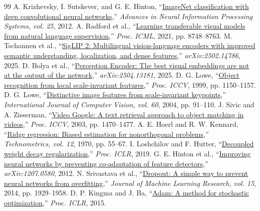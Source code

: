 \documentclass[conference,a4paper]{IEEEtran}
\begin{document}
\clearpage
{}
\begin{thebibliography}{99}
 A. Krizhevsky, I. Sutskever, and G. E. Hinton, ``\href{https://papers.nips.cc/paper_files/paper/2012/hash/c399862d3b9d6b76c8436e924a68c45b-Abstract.html}{ImageNet classification with deep convolutional neural networks},'' \emph{Advances in Neural Information Processing Systems, vol. 25}, 2012.
 A. Radford et al., ``\href{https://proceedings.mlr.press/v139/radford21a.html}{Learning transferable visual models from natural language supervision},'' \emph{Proc. ICML}, 2021, pp. 8748--8763.
 M. Tschannen et al., ``\href{https://arxiv.org/abs/2502.14786}{SigLIP 2: Multilingual vision-language encoders with improved semantic understanding, localization, and dense features},'' \emph{arXiv:2502.14786}, 2025.
 D. Bolya et al., ``\href{https://arxiv.org/abs/2504.13181}{Perception Encoder: The best visual embeddings are not at the output of the network},'' \emph{arXiv:2504.13181}, 2025.
 D. G. Lowe, ``\href{https://www.cs.ubc.ca/~lowe/papers/iccv99.pdf}{Object recognition from local scale-invariant features},'' \emph{Proc. ICCV}, 1999, pp. 1150--1157.
 D. G. Lowe, ``\href{https://www.cs.ubc.ca/~lowe/papers/ijcv04.pdf}{Distinctive image features from scale-invariant keypoints},'' \emph{International Journal of Computer Vision, vol. 60}, 2004, pp. 91--110.
 J. Sivic and A. Zisserman, ``\href{https://www.robots.ox.ac.uk/~vgg/publications/2003/Sivic03/}{Video Google: A text retrieval approach to object matching in videos},'' \emph{Proc. ICCV}, 2003, pp. 1470--1477.
 A. E. Hoerl and R. W. Kennard, ``\href{https://doi.org/10.1080/00401706.1970.10488634}{Ridge regression: Biased estimation for nonorthogonal problems},'' \emph{Technometrics, vol. 12}, 1970, pp. 55--67.
 I. Loshchilov and F. Hutter, ``\href{https://arxiv.org/abs/1711.05101}{Decoupled weight decay regularization},'' \emph{Proc. ICLR}, 2019.
 G. E. Hinton et al., ``\href{https://arxiv.org/abs/1207.0580}{Improving neural networks by preventing co-adaptation of feature detectors},'' \emph{arXiv:1207.0580}, 2012.
 N. Srivastava et al., ``\href{https://jmlr.org/papers/v15/srivastava14a.html}{Dropout: A simple way to prevent neural networks from overfitting},'' \emph{Journal of Machine Learning Research, vol. 15}, 2014, pp. 1929--1958.
 D. P. Kingma and J. Ba, ``\href{https://arxiv.org/abs/1412.6980}{Adam: A method for stochastic optimization},'' \emph{Proc. ICLR}, 2015.

\end{thebibliography}
\end{document}
